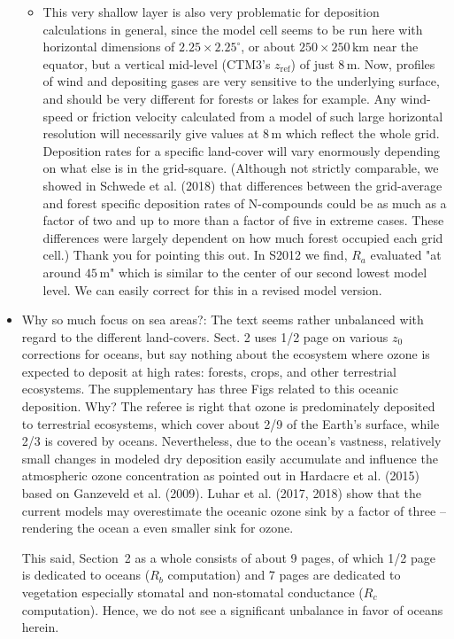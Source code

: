 \documentclass{scrartcl}
\begin{document}
\begin{itemize}
\begin{itemize}
\item {\color{blue} This very shallow layer is also very problematic for deposition calculations in general,
since the model cell seems to be run here with horizontal dimensions of $2.25 \times 2.25^\circ$,
or about $250 \times 250\,\mathrm{km}$ near the equator, but a vertical mid-level (CTM3’s $z_\mathrm{ref}$) of
just 8\,m. Now, profiles of wind and depositing gases are very sensitive to the underlying
surface, and should be very different for forests or lakes for example. Any wind-speed
or friction velocity calculated from a model of such large horizontal resolution will necessarily give values
at 8\,m which reflect the whole grid. Deposition rates for a specific
land-cover will vary enormously depending on what else is in the grid-square. (Although not strictly comparable,
we showed in Schwede et al. (2018) that differences
between the grid-average and forest specific deposition rates of N-compounds could be
as much as a factor of two and up to more than a factor of five in extreme cases. These
differences were largely dependent on how much forest occupied each grid cell.)}
  Thank you for pointing this out. In S2012 we find, $R_a$ evaluated "at around $45\,\mathrm{m}$" which is similar to the center of our second lowest model level. We can easily correct for this in a revised model version. 
  \end{itemize}
  
\item {\color{blue} Why so much focus on sea areas?: The text seems rather unbalanced with regard to the different land-covers. Sect. 2 uses 1/2 page on various $z_0$ corrections for oceans, but say nothing about the ecosystem
where ozone is expected to deposit at high rates: forests, crops, and other terrestrial
ecosystems. The supplementary has three Figs related to this oceanic deposition. Why?}
  The referee is right that ozone is predominately deposited to terrestrial ecosystems, which cover about 2/9 of the Earth's surface, while 2/3 is covered by oceans. Nevertheless, due to the ocean's vastness, relatively small changes in modeled dry deposition easily accumulate and influence the atmospheric ozone concentration as pointed out in Hardacre et al. (2015) based on Ganzeveld et al. (2009). Luhar et al. (2017, 2018) show that the current models may overestimate the oceanic ozone sink by a factor of three -- rendering the ocean a even smaller sink for ozone.
  
  This said, Section~2 as a whole consists of about 9 pages, of which 1/2 page is dedicated to oceans ($R_b$ computation) and 7 pages are dedicated to vegetation especially stomatal and non-stomatal conductance ($R_c$ computation). Hence, we do not see a significant unbalance in favor of oceans herein.


\end{itemize}
\end{document}
